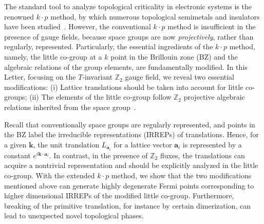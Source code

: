 \documentclass[aps,prl,twocolumn,noshowpacs,superscriptaddress]{revtex4-1}
\def \Z {\mathbb{Z}}
\begin{document}
The standard tool to analyze topological criticality in electronic systems is the renowned $k\cdot p$ method, by which numerous topological semimetals and insulators have been studied~\cite{Zhang2019,Vergniory2019,Tang2019a,Weikang_nodal-surface,Zhi-Ming_Nodalline,Zhi-Ming_no-go,Weikang_higher-order-Dirac,Ziming_higher-order-Dirac}. However, the conventional $k\cdot p$ method is insufficient in the presence of gauge fields, because space groups are now \textit{projectively}, rather than regularly, represented. Particularly, the essential ingredients of the $k\cdot p$ method, namely, the little co-group at a $k$ point in the Brillouin zone (BZ) and the algebraic relations of the group elements, are fundamentally modified.  In this Letter, focusing on the $T$-invariant $\Z_2$ gauge field, we reveal two essential modifications: (i) Lattice translations should be taken into account for little co-groups; (ii) The elements of the little co-group follow $\Z_2$ projective algebraic relations inherited from the space group~\cite{Note_ProjectiveRep}.

Recall that conventionally space groups are regularly represented, and points in the BZ label the irreducible representations (IRREPs) of translations. Hence, for a given $\bm{k}$, the unit translation $L_{\bm{a}_i}$ for a lattice vector $\bm{a}_i$ is represented by a constant $e^{i\bm{k}\cdot\bm{a}_i}$.
In contrast,  in the presence of $\Z_2$ fluxes, the translations can acquire a nontrivial representation and should be explicitly analyzed in the little co-group.
With the extended $k\cdot p$ method, we show that the two modifications mentioned above can generate highly degenerate Fermi points corresponding to higher dimensional IRREPs of the modified little co-group.
Furthermore, breaking of the primitive translation, for instance by certain dimerization, can lead to unexpected novel topological phases.
\end{document}
